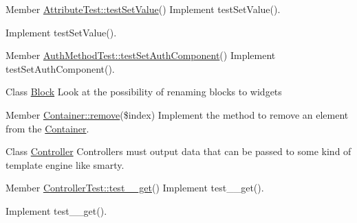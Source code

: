 \label{todo__todo000103}
\hypertarget{todo__todo000103}{}
 
\begin{DoxyDescription}
\item[Member \hyperlink{class_attribute_test_a55dbd68ed0dd6c1cdcdcff87c21157ab}{AttributeTest::testSetValue}() ]Implement testSetValue().

Implement testSetValue().
\end{DoxyDescription}

\label{todo__todo000008}
\hypertarget{todo__todo000008}{}
 
\begin{DoxyDescription}
\item[Member \hyperlink{class_auth_method_test_acfb4c4ea0e45403fd0244fd88c0339a9}{AuthMethodTest::testSetAuthComponent}() ]Implement testSetAuthComponent().
\end{DoxyDescription}

\label{todo__todo000384}
\hypertarget{todo__todo000384}{}
 
\begin{DoxyDescription}
\item[Class \hyperlink{class_block}{Block} ]Look at the possibility of renaming blocks to widgets 
\end{DoxyDescription}

\label{todo__todo000385}
\hypertarget{todo__todo000385}{}
 
\begin{DoxyDescription}
\item[Member \hyperlink{class_container_a6fcb84aedc2bf54f08f0d317e9130eec}{Container::remove}(\$index) ]Implement the method to remove an element from the \hyperlink{class_container}{Container}. 
\end{DoxyDescription}

\label{todo__todo000001}
\hypertarget{todo__todo000001}{}
 
\begin{DoxyDescription}
\item[Class \hyperlink{class_controller}{Controller} ]Controllers must output data that can be passed to some kind of template engine like smarty. 
\end{DoxyDescription}

\label{todo__todo000011}
\hypertarget{todo__todo000011}{}
 
\begin{DoxyDescription}
\item[Member \hyperlink{class_controller_test_a0bd71464eaa6e9559e3f4d78d70f224f}{ControllerTest::test\_\-\_\-get}() ]Implement test\_\-\_\-get().

Implement test\_\-\_\-get().
\end{DoxyDescription}

